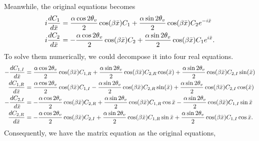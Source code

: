\documentclass[letterpaper,12pt,english]{sphinxmanual}
\begin{document}
Meanwhile, the original equations becomes
\begin{gather}
\begin{split}i \frac{d C_1}{d \bar x} &= \frac{\alpha \cos 2\theta_v }{2} \cos (\beta \bar x) C_1 + \frac{\alpha \sin 2\theta_v}{2} \cos (\beta \bar x) C_2 e^{-i\bar x} \\
i \frac{d C_2}{d\bar x} & =  -\frac{\alpha \cos 2\theta_v}{2} \cos (\beta\bar x) C_2 + \frac{\alpha \sin 2\theta_v}{2} \cos (\beta \bar x) C_1 e^{i\bar x}.\end{split}\notag
\end{gather}
To solve them numerically, we could decompose it into four real equations.
\begin{gather}
\begin{split}- \frac{d C_{1,I}}{d \bar x} &= \frac{\alpha \cos 2\theta_v}{2} \cos (\beta \bar x) C_{1,R} + \frac{\alpha \sin 2\theta_v}{2} \cos (\beta \bar x) C_{2,R} \cos(\bar x) + \frac{\alpha \sin 2\theta_v}{2} \cos (\beta \bar x) C_{2,I} \sin(\bar x) \\
\frac{d C_{1,R}}{d\bar x}& = \frac{\alpha \cos 2\theta_v}{2} \cos (\beta \bar x) C_{1,I} - \frac{\alpha \sin 2\theta_v}{2} \cos (\beta \bar x) C_{2,R} \sin(\bar x) + \frac{\alpha \sin 2\theta_v}{2} \cos (\beta \bar x) C_{2,I} \cos(\bar x) \\
-\frac{d C_{2,I}}{d\bar x}&= -\frac{\alpha \cos 2\theta_v}{2} \cos (\beta \bar x) C_{2,R} + \frac{\alpha \sin 2\theta_v}{2} \cos (\beta \bar x) C_{1,R}\cos \bar x - \frac{\alpha \sin 2\theta_v}{2} \cos (\beta \bar x) C_{1,I}\sin \bar x \\
\frac{d C_{2,R}}{d\bar x} & = -\frac{\alpha \cos 2\theta_v}{2} \cos (\beta \bar x)  C_{2,I} + \frac{\alpha \sin 2\theta_v}{2} \cos (\beta \bar x) C_{1,R} \sin \bar x + \frac{\alpha \sin 2\theta_v}{2}\cos (\beta \bar x) C_{1,I} \cos \bar x .\end{split}\notag
\end{gather}
Consequently, we have the matrix equation as the original equations,
\end{document}

